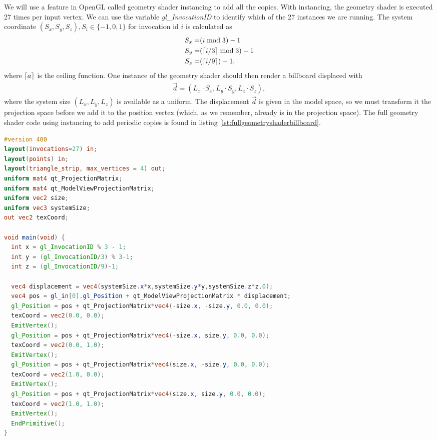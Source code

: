 We will use a feature in OpenGL called geometry shader instancing to add all the copies. With instancing, the geometry shader is executed 27 times per input vertex. We can use the variable \textit{gl\_InvocationID} to identify which of the 27 instances we are running. The system coordinate $(S_x, S_y, S_z), S_i \in \{-1, 0, 1\}$ for invocation id $i$ is calculated as
\begin{align}
	S_x =& (i\bmod 3) - 1\\
	S_y =& (\lceil i/3\rceil\bmod 3) - 1\\
	S_z =& (\lceil i/9\rceil) - 1,
\end{align}
where $\lceil a\rceil$ is the ceiling function. One instance of the geometry shader should then render a billboard displaced with 
\begin{align}
	\vec d = (L_x\cdot S_x, L_y\cdot S_y, L_z\cdot S_z),
\end{align}
where the system size $(L_x, L_y, L_z)$ is available as a uniform. The displacement $\vec d$ is given in the model space, so we must transform it the projection space before we add it to the position vertex (which, as we remember, already is in the projection space). The full geometry shader code using instancing to add periodic copies is found in listing \ref{lst:fullgeometryshaderbillboard}.
\begin{lstlisting}[caption=billboardGeometryShaderWithPeriodicCopies.glsl, label=lst:fullgeometryshaderbillboard, language=GLSL]
#version 400
layout(invocations=27) in;
layout(points) in;
layout(triangle_strip, max_vertices = 4) out;
uniform mat4 qt_ProjectionMatrix;
uniform mat4 qt_ModelViewProjectionMatrix;
uniform vec2 size;
uniform vec3 systemSize;
out vec2 texCoord;

void main(void) {
  int x = gl_InvocationID % 3 - 1;
  int y = (gl_InvocationID/3) % 3-1;
  int z = (gl_InvocationID/9)-1;
    
  vec4 displacement = vec4(systemSize.x*x,systemSize.y*y,systemSize.z*z,0);
  vec4 pos = gl_in[0].gl_Position + qt_ModelViewProjectionMatrix * displacement;
  gl_Position = pos + qt_ProjectionMatrix*vec4(-size.x, -size.y, 0.0, 0.0);
  texCoord = vec2(0.0, 0.0);
  EmitVertex();
  gl_Position = pos + qt_ProjectionMatrix*vec4(-size.x, size.y, 0.0, 0.0);
  texCoord = vec2(0.0, 1.0);
  EmitVertex();
  gl_Position = pos + qt_ProjectionMatrix*vec4(size.x, -size.y, 0.0, 0.0);
  texCoord = vec2(1.0, 0.0);
  EmitVertex();
  gl_Position = pos + qt_ProjectionMatrix*vec4(size.x, size.y, 0.0, 0.0);
  texCoord = vec2(1.0, 1.0);
  EmitVertex();
  EndPrimitive();
}
\end{lstlisting}
